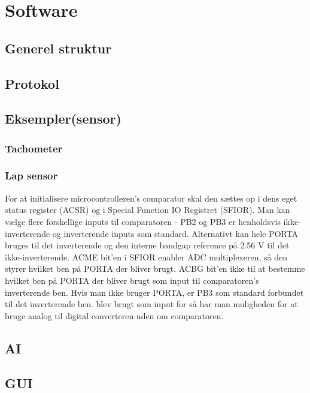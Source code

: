 \section{Software}

\subsection{Generel struktur}

\subsection{Protokol}

\subsection{Eksempler(sensor)}

\subsubsection{Tachometer}

\subsubsection{Lap sensor}

For at initialisere microcontrolleren's comparator skal den sættes op i dens eget status register (ACSR) og i Special Function IO Registret (SFIOR). Man kan vælge flere forskellige inputs til comparatoren - PB2 og PB3 er henholdsvis ikke-inverterende og inverterende inputs som standard. Alternativt kan hele PORTA bruges til det inverterende og den interne bandgap reference på 2.56 V til det ikke-inverterende.  ACME bit'en i SFIOR enabler ADC multiplexeren, så den styrer hvilket ben på PORTA der bliver brugt. ACBG bit'en ikke til at bestemme hvilket ben på PORTA der bliver brugt som input til comparatoren's inverterende ben.  Hvis man ikke bruger PORTA, er PB3 som standard forbundet til det inverterende ben. blev brugt som input for så har man muligheden for at bruge analog til digital converteren uden om comparatoren. 

\subsection{AI}

\subsection{GUI}
